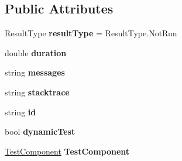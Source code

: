 \subsection*{Public Attributes}
\begin{DoxyCompactItemize}
\item 
\mbox{\label{class_unity_test_1_1_test_result_a873fc270985f4b7ac796ff6d9de82081}} 
Result\+Type {\bfseries result\+Type} = Result\+Type.\+Not\+Run
\item 
\mbox{\label{class_unity_test_1_1_test_result_ae6b08791b72ab1e45ab6be51afdf089e}} 
double {\bfseries duration}
\item 
\mbox{\label{class_unity_test_1_1_test_result_ac190564c89620ea78a5c4db90220d501}} 
string {\bfseries messages}
\item 
\mbox{\label{class_unity_test_1_1_test_result_aef4da821cddbfe75352ef77721cc9dae}} 
string {\bfseries stacktrace}
\item 
\mbox{\label{class_unity_test_1_1_test_result_a808f0f27a9241ec20ec2a2676ec714fc}} 
string {\bfseries id}
\item 
\mbox{\label{class_unity_test_1_1_test_result_af2fc6ca57eb5da7b85982bd605e50fb1}} 
bool {\bfseries dynamic\+Test}
\item 
\mbox{\label{class_unity_test_1_1_test_result_a9e8a54c64f34bffebe7a24c6fd1825bd}} 
\hyperlink{class_unity_test_1_1_test_component}{Test\+Component} {\bfseries Test\+Component}
\end{DoxyCompactItemize}
